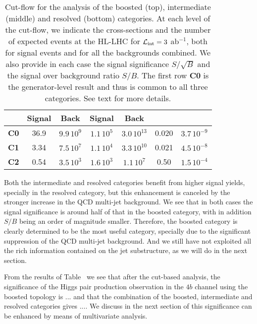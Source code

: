 \begin{table}[t]
\begin{tabular}{c|c|c|c|c|c|c}
      &    Signal & Back   &  Signal  & Back
    &   & \\
    \hline
       {\bf C0}  &  36.9  & $9.9\,10^{9}$ & $1.1\,10^5$ & $3.0\,10^{13}$  &  0.020 & $3.7\,10^{-9}$\\
        {\bf C1}  &   3.34    & $7.5\,10^{7}$    & $1.1\,10^4$    & $3.3\,10^{10}$     & 0.021     & $4.5\,10^{-8}$  \\
        {\bf C2}  &   0.54    &  $3.5\,10^{3}$   &  $1.6\,10^{3}$   &   $1.1\,10^{7}$   & 0.50     &  $1.5\,10^{-4}$ \\
        \hline
  \end{tabular}
  \caption{\small Cut-flow for the analysis of the boosted (top),
    intermediate (middle) and resolved (bottom)
    categories.
    At each level of the cut-flow, we indicate the cross-sections and the number of
    expected events at the HL-LHC for $\mathcal{L}_{\rm int}=3$ ab$^{-1}$, both for
    signal events and for all the backgrounds combined.
    We also provide in each case the
    signal significance $S/\sqrt{B}$ and the signal
    over background ratio $S/B$.
    The first row {\bf C0} is the generator-level result and thus is common
    to all three categories.
    See text for more details.
    \label{table:cutflow}
  }
\end{table}

Both the intermediate and resolved categories benefit from higher signal yields,
specially in the resolved category, but this enhancement is canceled by the stronger
increase in the QCD multi-jet background.
%
We see that in both cases the signal significance is around half of that in the boosted category,
with in addition $S/B$ being an order of magnitude smaller.
%
Therefore, the boosted category is clearly determined to be the most useful category,
specially due to the significant suppression of the QCD multi-jet background.
%
And we still have not exploited all the rich information contained on the jet
substructure, as we will do in the next section.

From the results of Table~\label{table:cutflowboosted}
we see that after the cut-based analysis, the significance of the Higgs pair production
observation in the $4b$ channel using the boosted topology is ... and that the combination
of the boosted, intermediate and resolved categories gives ....
%
We discuss in the next section of this significance can be enhanced by means
of multivariate analysis.

